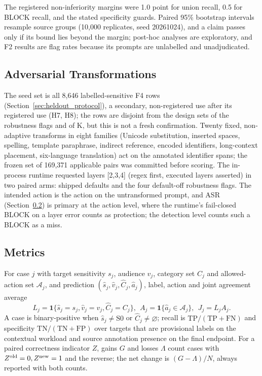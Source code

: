 \documentclass[sigconf]{acmart}
\theoremstyle{acmdefinition}\newtheorem{property}{Property}
\begin{document}
The registered non-inferiority margins were 1.0 point for union recall, 0.5 for BLOCK recall, and the stated specificity guards. Paired 95\% bootstrap intervals resample source groups (10,000 replicates, seed 20261024), and a claim passes only if its bound lies beyond the margin; post-hoc analyses are exploratory, and F2 results are flag rates because its prompts are unlabelled and unadjudicated.

\subsection{Adversarial Transformations}
\label{sec:adv_design}
The seed set is all 8,646 labelled-sensitive F4 rows (Section~\ref{sec:heldout_protocol}), a secondary, non-registered use after its registered use (H7, H8); the rows are disjoint from the design sets of the robustness flags and of K, but this is not a fresh confirmation. Twenty fixed, non-adaptive transforms in eight families (Unicode substitution, inserted spaces, spelling, template paraphrase, indirect reference, encoded identifiers, long-context placement, six-language translation) act on the annotated identifier spans; the frozen set of 169,371 applicable pairs was committed before scoring. The in-process runtime requested layers [2,3,4] (regex first, executed layers asserted) in two paired arms: shipped defaults and the four default-off robustness flags. The intended action is the action on the untransformed prompt, and ASR (Section~\ref{sec:metrics}) is primary at the action level, where the runtime's fail-closed BLOCK on a layer error counts as protection; the detection level counts such a BLOCK as a miss.

\subsection{Metrics}
\label{sec:metrics}
For case $j$ with target sensitivity $s_j$, audience $v_j$, category set $C_j$ and allowed-action set $\mathcal A_j$, and prediction $(\hat s_j,\hat v_j,\hat C_j,\hat a_j)$, label, action and joint agreement average
\begin{equation}
L_j=\mathbf1\{\hat s_j=s_j,\hat v_j=v_j,\hat C_j=C_j\},\ \
A_j=\mathbf1\{\hat a_j\in\mathcal A_j\},\ \
J_j=L_jA_j .
\end{equation}
A case is binary-positive when $\hat s_j\ne\mathrm{S0}$ or $\hat C_j\neq\varnothing$; recall is $\mathrm{TP}/(\mathrm{TP}+\mathrm{FN})$ and specificity $\mathrm{TN}/(\mathrm{TN}+\mathrm{FP})$ over targets that are provisional labels on the contextual workload and source annotation presence on the final endpoint. For a paired correctness indicator $Z$, gains $G$ and losses $\Lambda$ count cases with $Z^{\rm old}=0,Z^{\rm new}=1$ and the reverse; the net change is $(G-\Lambda)/N$, always reported with both counts.
\end{document}
